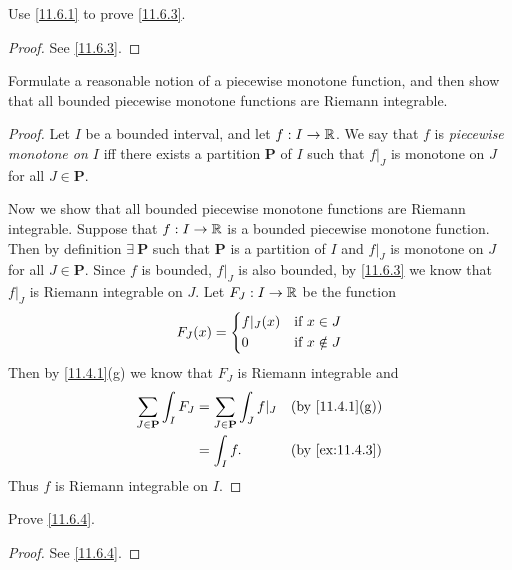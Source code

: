 \exercisesection

\begin{ex}\label{ex:11.6.1}
  Use \cref{11.6.1} to prove \cref{11.6.3}.
\end{ex}

\begin{proof}
  See \cref{11.6.3}.
\end{proof}

\begin{ex}\label{ex:11.6.2}
  Formulate a reasonable notion of a piecewise monotone function, and then show that all bounded piecewise monotone functions are Riemann integrable.
\end{ex}

\begin{proof}
  Let \(I\) be a bounded interval, and let \(f : I \to \mathbb{R}\).
  We say that \(f\) is \emph{piecewise monotone on \(I\)} iff there exists a partition \(\mathbf{P}\) of \(I\) such that \(f|_J\) is monotone on \(J\) for all \(J \in \mathbf{P}\).

  Now we show that all bounded piecewise monotone functions are Riemann integrable.
  Suppose that \(f : I \to \mathbb{R}\) is a bounded piecewise monotone function.
  Then by definition \(\exists\ \mathbf{P}\) such that \(\mathbf{P}\) is a partition of \(I\) and \(f|_J\) is monotone on \(J\) for all \(J \in \mathbf{P}\).
  Since \(f\) is bounded, \(f|_J\) is also bounded, by \cref{11.6.3} we know that \(f|_J\) is Riemann integrable on \(J\).
  Let \(F_J : I \to \mathbb{R}\) be the function
  \[
    F_J(x) = \begin{dcases}
      f|_J(x) & \text{if } x \in J    \\
      0       & \text{if } x \notin J
    \end{dcases}
  \]
  Then by \cref{11.4.1}(g) we know that \(F_J\) is Riemann integrable and
  \begin{align*}
    \sum_{J \in \mathbf{P}} \int_I F_J & = \sum_{J \in \mathbf{P}} \int_J f|_J &  & \text{(by \cref{11.4.1}(g))} \\
                                       & = \int_I f.                           &  & \text{(by \cref{ex:11.4.3})}
  \end{align*}
  Thus \(f\) is Riemann integrable on \(I\).
\end{proof}

\begin{ex}\label{ex:11.6.3}
  Prove \cref{11.6.4}.
\end{ex}

\begin{proof}
  See \cref{11.6.4}.
\end{proof}

